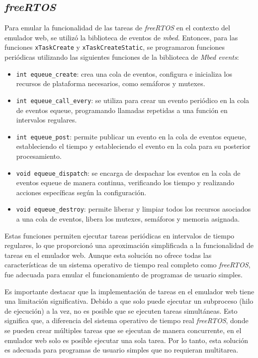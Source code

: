 \subsection{\textit{\textbf{freeRTOS}}}

Para emular la funcionalidad de las tareas de \textit{freeRTOS} en el contexto del emulador web, se utilizó la biblioteca de eventos de \textit{mbed}. Entonces, para las funciones \texttt{xTaskCreate} y \texttt{xTaskCreateStatic}, se programaron funciones periódicas utilizando las siguientes funciones de la biblioteca de \textit{Mbed events}: 

 \begin{itemize}
	\item \texttt{int equeue\_create}:  crea una cola de eventos, configura e inicializa los recursos de plataforma necesarios, como semáforos y mutexes.
	
	\item \texttt{int equeue\_call\_every}:  se utiliza para crear un evento periódico en la cola de eventos equeue, programando llamadas repetidas a una función en intervalos regulares.
	
	\item \texttt{int equeue\_post}: permite publicar un evento en la cola de eventos equeue, estableciendo el tiempo y estableciendo el evento en la cola para su posterior procesamiento.
	
	\item \texttt{void equeue\_dispatch}: se encarga de despachar los eventos en la cola de eventos equeue de manera continua, verificando los tiempo y realizando acciones específicas según la configuración.

	\item \texttt{void equeue\_destroy}: permite liberar y limpiar todos los recursos asociados a una cola de eventos, libera los mutexes, semáforos y memoria asignada.
\end{itemize}

Estas funciones permiten ejecutar tareas periódicas en intervalos de tiempo regulares, lo que proporcionó una aproximación simplificada a la funcionalidad de tareas en el emulador web. Aunque esta solución no ofrece todas las características de un sistema operativo de tiempo real completo como \textit{freeRTOS}, fue adecuada para emular el funcionamiento de programas de usuario simples.

Es importante destacar que la implementación de tareas en el emulador web tiene una limitación significativa. Debido a que solo puede ejecutar un subproceso (hilo de ejecución) a la vez, no es posible que se ejecuten tareas simultáneas. Esto significa que, a diferencia del sistema operativo de tiempo real \textit{freeRTOS}, donde se pueden crear múltiples tareas que se ejecutan de manera concurrente, en el emulador web solo es posible ejecutar una sola tarea. Por lo tanto, esta solución es adecuada para programas de usuario simples que no requieran multitarea.

